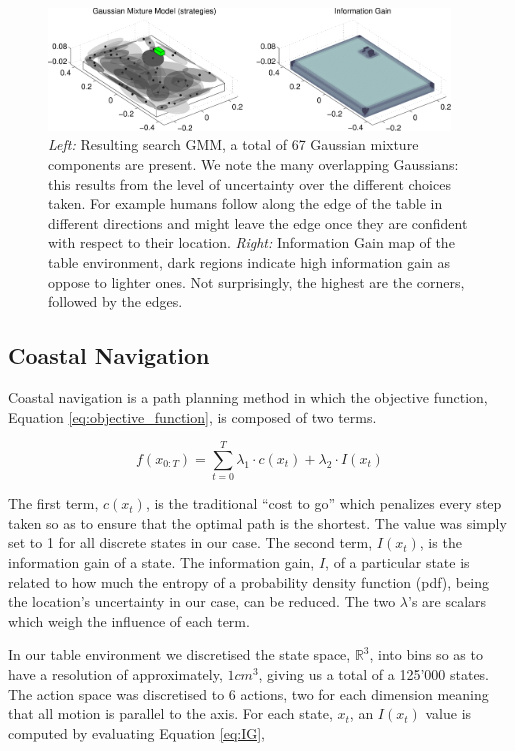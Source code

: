 \begin{figure}
\centering
  \includegraphics[width=0.95\textwidth]{./ch3-Search/Figures/Figure4}
  \caption{\textit{Left: } Resulting search GMM, a total of 67 Gaussian mixture components are present. We note the many overlapping Gaussians: this results
from the level of uncertainty over the different choices taken. For example humans follow along the edge of the table in different directions and might
leave the edge once they are confident with respect to their location. \textit{Right:} Information Gain map of the table environment, dark regions indicate 
high information gain as oppose to lighter ones. Not surprisingly, the highest are the corners, followed by the edges.}
  \label{fig:gmm}
\end{figure}

\subsection{Coastal Navigation}\label{chap3:costal_policy}

Coastal navigation \cite{CostalNavigation1999} is a path planning method in which the objective function, 
Equation \ref{eq:objective_function}, is composed of two terms.

\begin{equation}\label{eq:objective_function}
 f(x_{0:T}) = \sum\limits_{t=0}^{T} \lambda_1 \cdot c(x_t) + \lambda_2 \cdot I(x_t)
\end{equation}

The first term, $c(x_t)$, is the traditional ``cost to go'' which penalizes every step taken so as to ensure that the
optimal path is the shortest. The value was simply set to 1 for all discrete states in our case. The second term, $I(x_t)$, 
is the information gain of a state. The information gain, $I$, of a particular state is related to how much 
the entropy of a probability density function (pdf), being the location's uncertainty in our case, can be reduced. The two $\lambda$'s are scalars which weigh the influence 
of each term.

In our table environment we discretised the state space, $\mathbb{R}^3$, into bins so as to have a resolution of approximately, $1 cm^3$, giving us a total of a 125'000
states. The action space was discretised to 6 actions, two for each dimension meaning that all motion is parallel to the axis. For each state, $x_t$, an $I(x_t)$ value is
computed by evaluating Equation \ref{eq:IG},

